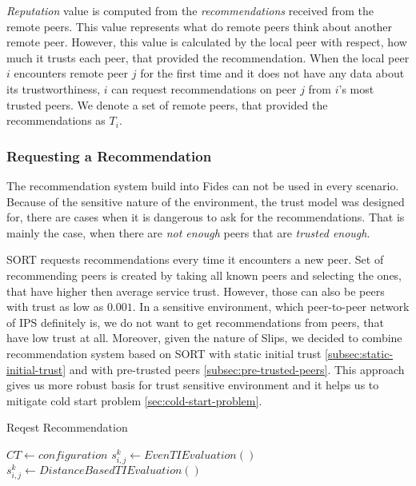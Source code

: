 \textit{Reputation} value is computed from the \textit{recommendations} received from the remote peers. This value represents what do remote peers think about another remote peer. However, this value is calculated by the local peer with respect, how much it trusts each peer, that provided the recommendation.
When the local peer $i$ encounters remote peer $j$ for the first time and it does not have any data about its trustworthiness, $i$ can request recommendations on peer $j$ from $i$'s most trusted peers.
We denote a set of remote peers, that provided the recommendations as $T_{i}$.

\subsubsection{Requesting a Recommendation}
The recommendation system build into Fides can not be used in every scenario.
Because of the sensitive nature of the environment, the trust model was designed for, there are cases when it is dangerous to ask for the recommendations.
That is mainly the case, when there are \textit{not enough} peers that are \textit{trusted enough}.

SORT \cite{sort} requests recommendations every time it encounters a new peer. Set of recommending peers is created by taking all known peers and selecting the ones, that have higher then average service trust.
However, those can also be peers with trust as low as $0.001$. In a sensitive environment, which peer-to-peer network of IPS definitely is, we do not want to get recommendations from peers, that have low trust at all.
Moreover, given the nature of Slips, we decided to combine recommendation system based on SORT with static initial trust \ref{subsec:static-initial-trust} and with pre-trusted peers \ref{subsec:pre-trusted-peers}. 
This approach gives us more robust basis for trust sensitive environment and it helps us to mitigate cold start problem \ref{sec:cold-start-problem}.

\begin{algorithm}
\caption{Reqest Recommendation}\label{alg:threshold-ti-evaluation}
\begin{algorithmic}[1]
\State ${CT} \gets configuration$ 
	\State $s^{k}_{i, j} \gets EvenTIEvaluation()$
\Else
    \State $s^{k}_{i, j} \gets DistanceBasedTIEvaluation()$
\EndIf
\end{algorithmic}
\end{algorithm}


